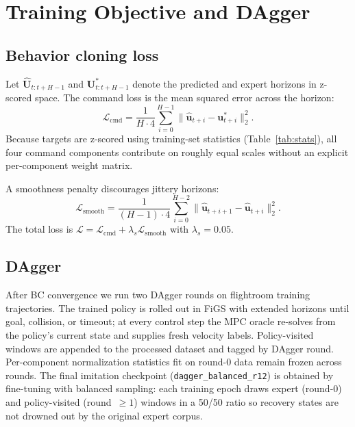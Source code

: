 \documentclass[10pt,twocolumn,letterpaper]{article}
\begin{document}
\section{Training Objective and DAgger}
\label{sec:training}

\subsection{Behavior cloning loss}

Let $\hat{\mathbf{U}}_{t:t+H-1}$ and $\mathbf{U}^{*}_{t:t+H-1}$ denote the predicted and expert horizons in z-scored space. The command loss is the mean squared error across the horizon:
\begin{equation}
\label{eq:mse}
\mathcal{L}_{\mathrm{cmd}} = \frac{1}{H \cdot 4} \sum_{i=0}^{H-1} \|\hat{\mathbf{u}}_{t+i} - \mathbf{u}^{*}_{t+i}\|_2^2.
\end{equation}
Because targets are z-scored using training-set statistics (Table~\ref{tab:stats}), all four command components contribute on roughly equal scales without an explicit per-component weight matrix.

A smoothness penalty discourages jittery horizons:
\begin{equation}
\label{eq:smooth}
\mathcal{L}_{\mathrm{smooth}} = \frac{1}{(H{-}1) \cdot 4} \sum_{i=0}^{H-2} \|\hat{\mathbf{u}}_{t+i+1} - \hat{\mathbf{u}}_{t+i}\|_2^2.
\end{equation}
The total loss is $\mathcal{L} = \mathcal{L}_{\mathrm{cmd}} + \lambda_s \mathcal{L}_{\mathrm{smooth}}$ with $\lambda_s = 0.05$.

\subsection{DAgger}

After BC convergence we run two DAgger rounds on flightroom training trajectories. The trained policy is rolled out in FiGS with extended horizons until goal, collision, or timeout; at every control step the MPC oracle re-solves from the policy's current state and supplies fresh velocity labels. Policy-visited windows are appended to the processed dataset and tagged by DAgger round. Per-component normalization statistics fit on round-$0$ data remain frozen across rounds. The final imitation checkpoint (\texttt{dagger\_balanced\_r12}) is obtained by fine-tuning with balanced sampling: each training epoch draws expert (round-$0$) and policy-visited (round~${\geq}1$) windows in a 50/50 ratio so recovery states are not drowned out by the original expert corpus.
\end{document}
